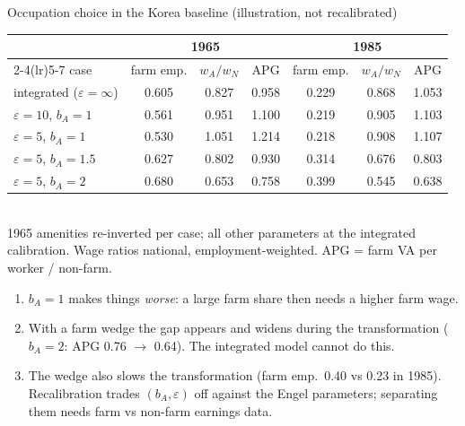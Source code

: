 \documentclass[10pt,aspectratio=169]{beamer}
\newcommand{\hl}[1]{\textcolor{mOrange}{#1}}
\begin{document}
\begin{frame}{Occupation choice in the Korea baseline (illustration, not recalibrated)}
  \footnotesize
  \centering
  \begin{tabular}{@{}lcccccc@{}}
    \toprule
    & \multicolumn{3}{c}{1965} & \multicolumn{3}{c}{1985} \\
    \cmidrule(lr){2-4}\cmidrule(lr){5-7}
    case & farm emp. & $w_A/w_N$ & APG & farm emp. & $w_A/w_N$ & APG \\
    \midrule
    integrated ($\varepsilon=\infty$) & 0.605 & 0.827 & 0.958 & 0.229 & 0.868 & 1.053 \\
    $\varepsilon=10$, $b_A=1$ & 0.561 & 0.951 & 1.100 & 0.219 & 0.905 & 1.103 \\
    $\varepsilon=5$, $b_A=1$ & 0.530 & 1.051 & 1.214 & 0.218 & 0.908 & 1.107 \\
    $\varepsilon=5$, $b_A=1.5$ & 0.627 & 0.802 & 0.930 & 0.314 & 0.676 & 0.803 \\
    $\varepsilon=5$, $b_A=2$ & 0.680 & 0.653 & \hl{0.758} & 0.399 & 0.545 & \hl{0.638} \\
    \bottomrule
  \end{tabular}\\[0.2em]
  \tiny 1965 amenities re-inverted per case; all other parameters at the integrated
  calibration. Wage ratios national, employment-weighted. APG = farm VA per worker / non-farm.
  \vspace{0.4em}
  \begin{enumerate}\small
    \item $b_A=1$ makes things \emph{worse}: a large farm share then needs a higher farm wage.
    \item With a farm wedge the gap \hl{appears and widens} during the transformation
          ($b_A=2$: APG 0.76 $\to$ 0.64). The integrated model cannot do this.
    \item The wedge also \hl{slows} the transformation (farm emp.\ 0.40 vs 0.23 in 1985).
          Recalibration trades $(b_A,\varepsilon)$ off against the Engel parameters;
          separating them needs farm vs non-farm earnings data.
  \end{enumerate}
\end{frame}
\end{document}
